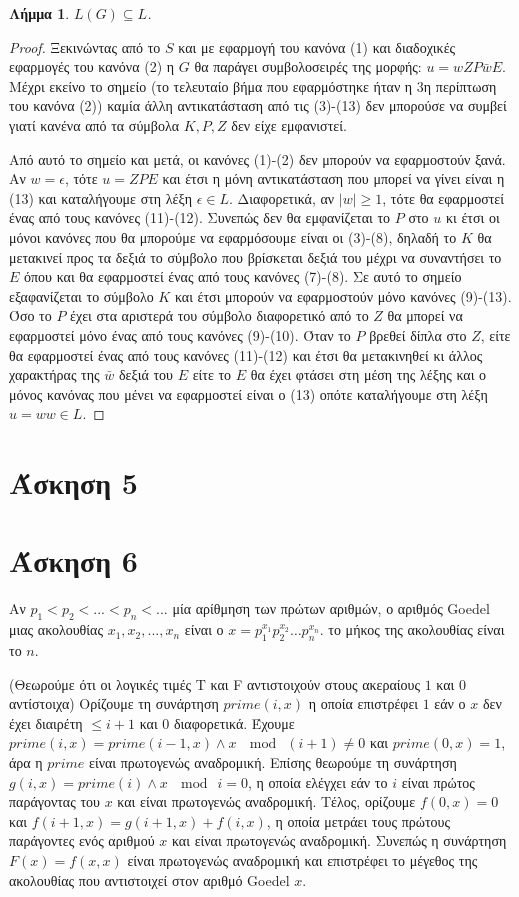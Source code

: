 \documentclass[a4paper, oneside, 11pt]{article}
\newtheorem{lm}[thm]{Λήμμα}
\theoremstyle{definition}
\begin{document}
\begin{lm}
$L(G) \subseteq L$.
\end{lm}
\begin{proof}
Ξεκινώντας από το $S$ και με εφαρμογή του κανόνα (1) και διαδοχικές εφαρμογές
του κανόνα (2) η $G$ θα παράγει συμβολοσειρές της μορφής: $u = wZP\bar{w}E$. Μέχρι
εκείνο το σημείο (το τελευταίο βήμα που εφαρμόστηκε ήταν η 3η περίπτωση του
κανόνα (2)) καμία άλλη αντικατάσταση από τις (3)-(13) δεν μπορούσε να συμβεί
γιατί κανένα από τα σύμβολα $K, P, Z$ δεν είχε εμφανιστεί.

Από αυτό το σημείο και μετά, οι κανόνες (1)-(2) δεν μπορούν να εφαρμοστούν ξανά.
Αν $w = \epsilon$, τότε $u = ZPE$ και έτσι η μόνη αντικατάσταση που μπορεί να
γίνει είναι η (13) και καταλήγουμε στη λέξη $\epsilon \in L$.  Διαφορετικά, αν
$|w| \geq 1$, τότε θα εφαρμοστεί ένας από τους κανόνες (11)-(12). Συνεπώς δεν θα
εμφανίζεται το $P$ στο $u$ κι έτσι οι μόνοι κανόνες που θα μπορούμε να
εφαρμόσουμε είναι οι (3)-(8), δηλαδή το $K$ θα μετακινεί προς τα δεξιά το
σύμβολο που βρίσκεται δεξιά του μέχρι να συναντήσει το $E$ όπου και θα
εφαρμοστεί ένας από τους κανόνες (7)-(8). Σε αυτό το σημείο εξαφανίζεται το
σύμβολο $K$ και έτσι μπορούν να εφαρμοστούν μόνο κανόνες (9)-(13). Όσο το $P$
έχει στα αριστερά του σύμβολο διαφορετικό από το $Z$ θα μπορεί να εφαρμοστεί
μόνο ένας από τους κανόνες (9)-(10). Όταν το $P$ βρεθεί δίπλα στο $Z$, είτε θα
εφαρμοστεί ένας από τους κανόνες (11)-(12) και έτσι θα μετακινηθεί κι άλλος
χαρακτήρας της $\bar{w}$ δεξιά του $E$ είτε το $E$ θα έχει φτάσει στη μέση της
λέξης και ο μόνος κανόνας που μένει να εφαρμοστεί είναι ο (13) οπότε καταλήγουμε
στη λέξη $u = ww \in L$.

\end{proof}

\section*{Άσκηση 5}

\section*{Άσκηση 6}
Αν $p_1<p_2<...<p_n<...$ μία αρίθμηση των πρώτων αριθμών, ο αριθμός Goedel μιας ακολουθίας $x_1,x_2,...,x_n$ είναι ο
$x = p_1^{x_1}p_2^{x_2}\dots p_n^{x_n}$. το μήκος της ακολουθίας είναι το $n$.

(Θεωρούμε ότι οι λογικές τιμές T και F αντιστοιχούν στους ακεραίους $1$ και $0$ αντίστοιχα)
Ορίζουμε τη συνάρτηση $prime(i,x)$ η οποία επιστρέφει $1$ εάν ο $x$ δεν έχει διαιρέτη $\leq i+1$ και $0$ διαφορετικά.
Έχουμε $prime(i,x)=prime(i-1,x)\land x\ \mod\ (i+1)\neq 0$ και $prime(0,x)=1$, άρα η $prime$ είναι πρωτογενώς αναδρομική.
Επίσης θεωρούμε τη συνάρτηση $g(i,x)=prime(i)\land x\ \mod\ i=0$, η οποία ελέγχει εάν το $i$ είναι πρώτος παράγοντας του $x$ και
είναι πρωτογενώς αναδρομική. Τέλος, ορίζουμε $f(0,x)=0$ και $f(i+1,x)=g(i+1,x) + f(i,x)$, η οποία μετράει τους πρώτους παράγοντες
ενός αριθμού $x$ και είναι πρωτογενώς αναδρομική. Συνεπώς η συνάρτηση $F(x)=f(x,x)$ είναι πρωτογενώς αναδρομική και επιστρέφει
το μέγεθος της ακολουθίας που αντιστοιχεί στον αριθμό Goedel $x$.
\end{document}

